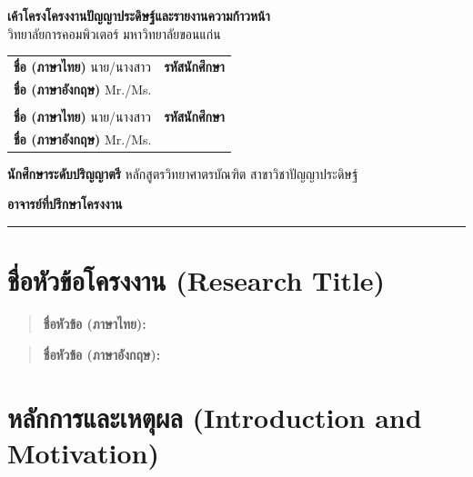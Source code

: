 \documentclass[20pt,a4paper]{article}
\newcommand{\titleTH}{\dotfill}
\newcommand{\titleEN}{\dotfill}
\newcommand{\firstStudentId}{\dotfill}
\newcommand{\firstStudentPrefixTH}{นาย/นางสาว}
\newcommand{\firstStudentNameTH}{\dotfill}
\newcommand{\firstStudentPrefixEN}{Mr./Ms.}
\newcommand{\firstStudentNameEN}{\dotfill}
\newcommand{\secondStudentId}{\dotfill}
\newcommand{\secondStudentPrefixTH}{นาย/นางสาว}
\newcommand{\secondStudentNameTH}{\dotfill}
\newcommand{\secondStudentPrefixEN}{Mr./Ms.}
\newcommand{\secondStudentNameEN}{\dotfill}
\newcommand{\major}{ปัญญาประดิษฐ์}
\newcommand{\advisor}{\dotfill}
\begin{document}
\begin{center}
\Large
\textbf{เค้าโครงโครงงานปัญญาประดิษฐ์และรายงานความก้าวหน้า}
\\
\large
วิทยาลัยการคอมพิวเตอร์ มหาวิทยาลัยขอนแก่น
\end{center} 

\noindent
\begin{tabular}{@{}p{}@{}@{}p{}@{}}
\\
\textbf{ชื่อ (ภาษาไทย)} \firstStudentPrefixTH \firstStudentNameTH
& \textbf{รหัสนักศึกษา} \firstStudentId
\\ \textbf{ชื่อ (ภาษาอังกฤษ)} \firstStudentPrefixEN \firstStudentNameEN  & 
\\
 & 
\\
\textbf{ชื่อ (ภาษาไทย)} \secondStudentPrefixTH \secondStudentNameTH
& \textbf{รหัสนักศึกษา} \secondStudentId
\\ \textbf{ชื่อ (ภาษาอังกฤษ)} \secondStudentPrefixEN \secondStudentNameEN  &
\\
\end{tabular}

\vspace{1em}
\noindent \textbf{นักศึกษาระดับปริญญาตรี} หลักสูตรวิทยาศาตรบัณฑิต สาขาวิชา\major


\vspace{1em}
\noindent \textbf{อาจารย์ที่ปรึกษาโครงงาน} \advisor

\noindent\rule{\textwidth}{0.1pt}


\section{ชื่อหัวข้อโครงงาน (Research Title)}

\begin{quote}
\textbf{ชื่อหัวข้อ (ภาษาไทย):} \titleTH
\end{quote}

\begin{quote}
\textbf{ชื่อหัวข้อ (ภาษาอังกฤษ):} \titleEN
\end{quote}


\section{หลักการและเหตุผล
(Introduction and Motivation)}
\end{document}
